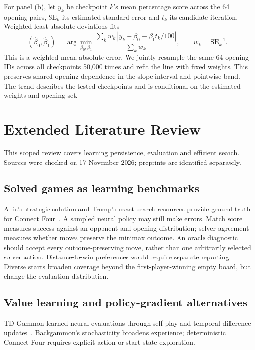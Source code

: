 \documentclass[letterpaper]{article}
\begin{document}
For panel (b), let $\bar y_k$ be checkpoint $k$'s mean percentage score
across the 64 opening pairs, $\mathrm{SE}_k$ its estimated standard error
and $t_k$ its candidate iteration. Weighted least absolute deviations fits
\begin{equation}
 (\widehat\beta_0,\widehat\beta_1)
 =\arg\min_{\beta_0,\beta_1}\,
 \frac{\sum_k w_k\,|\bar y_k-\beta_0-\beta_1 t_k/100|}{\sum_k w_k},
 \qquad w_k=\mathrm{SE}_k^{-1}.
 \label{eq:linear-trend}
\end{equation}
This is a weighted mean absolute error. We jointly resample the same 64
opening IDs across all checkpoints 50,000 times and refit the line with
fixed weights. This preserves shared-opening dependence in the slope
interval and pointwise band. The trend describes the tested checkpoints
and is conditional on the estimated weights and opening set.

\clearpage
\section{Extended Literature Review}
\label{app:literature}
This scoped review covers learning persistence, evaluation and efficient search.
Sources were checked on 17 November 2026; preprints are identified separately.

\subsection{Solved games as learning benchmarks}
Allis's strategic solution and Tromp's exact-search resources provide ground
truth for Connect Four~\cite{allis1988,tromp}. A sampled neural policy may still
make errors. Match score measures success against an opponent and opening
distribution; solver agreement measures whether moves preserve the minimax
outcome. An oracle diagnostic should accept every outcome-preserving move,
rather than one arbitrarily selected solver action. Distance-to-win preferences
would require separate reporting. Diverse starts broaden coverage beyond the
first-player-winning empty board, but change the evaluation distribution.

\subsection{Value learning and policy-gradient alternatives}
TD-Gammon learned neural evaluations through self-play and temporal-difference
updates~\cite{tesauro1995}. Backgammon's stochasticity broadens experience;
deterministic Connect Four requires explicit action or start-state exploration.
\end{document}
